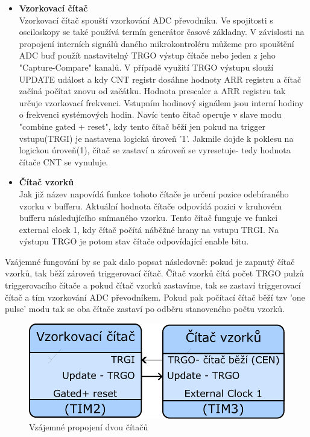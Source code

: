 \begin{itemize}
	\item \textbf{Vzorkovací čítač }\\
	Vzorkovací čítač spouští vzorkování ADC převodníku. Ve spojitosti s osciloskopy se také používá termín generátor časové základny. V závislosti na propojení interních signálů daného mikrokontroléru můžeme pro spouštění ADC buď použít nastavitelný TRGO výstup čítače nebo jeden z jeho "Capture-Compare" kanalů. V případě využití TRGO výstupu slouží UPDATE událost a kdy CNT registr dosáhne hodnoty ARR registru a čítač začíná počítat znovu od začátku. Hodnota prescaler a ARR registru tak určuje vzorkovací frekvenci. Vstupním hodinový signálem jsou interní hodiny o frekvenci systémových hodin. Navíc tento čítač operuje v slave modu "combine gated + reset", kdy tento čítač běží jen pokud na trigger vstupu(TRGI) je nastavena logická úroveň '1'. Jakmile dojde k poklesu na logickou úroveň(1), čítač se zastaví a zároveň se vyresetuje- tedy hodnota čítače CNT se vynuluje.
	
	\item \textbf{Čítač vzorků}\\
	Jak již název napovídá funkce tohoto čítače je určení pozice odebíraného vzorku v bufferu. Aktuální hodnota čítače odpovídá pozici v kruhovém bufferu následujícího snímaného vzorku. Tento čítač funguje ve funkci external clock 1, kdy čítač počítá náběžné hrany na vstupu TRGI. Na výstupu TRGO je potom stav čítače odpovídající enable bitu.
\end{itemize}

Vzájemné fungování by se pak dalo popsat následovně: pokud je zapnutý čítač vzorků, tak běží zároveň triggerovací čítač. Čítač vzorků čítá počet TRGO pulzů triggerovacího čítače a pokud čítač vzorků zastavíme, tak se zastaví triggerovací čítač a tím vzorkování ADC převodníkem. Pokud pak počítací čítač běží tzv 'one pulse' modu tak se oba čítače zastaví po odběru stanoveného počtu vzorků. 
\begin{figure}[H]
	\centering
	\includegraphics[width=0.5\linewidth]{Figs/Diagrams/SVG/SamplingTimerConnection.pdf}      
	\caption{Vzájemné propojení dvou čítačů}
	\label{fig:samplingtimerstrgitrgo}
\end{figure}

